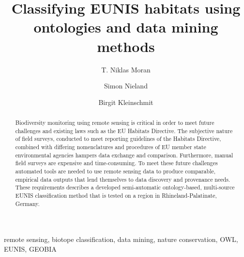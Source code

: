 \documentclass[authoryear,preprint,12pt,number]{elsarticle}
\begin{document}
\tableofcontents

\printglossary

%
\lstset{language=XML}

\begin{frontmatter}
\title{Classifying EUNIS habitats using ontologies and data mining methods}

\author[TUB]{T. Niklas Moran}

\author[TUB]{Simon Nieland}
\author[TUB]{Birgit Kleinschmit}

\address[TUB]{Geoinformation in Environmental Planning Lab, Technische
Universit\"at Berlin, Stra\ss e des 17. Juni 145, 10623 Berlin, Germany}


\begin{abstract}
Biodiversity monitoring using remote sensing is critical in order to 
meet future challenges and existing laws such as the EU Habitats Directive. The 
subjective nature of field surveys, conducted to meet reporting guidelines of  
the Habitats Directive, combined with differing nomenclatures and procedures 
of EU member state environmental agencies hampers data exchange and comparison. 
Furthermore, manual field surveys are expensive and time-consuming. To meet 
these future challenges automated tools are needed to use remote 
sensing data to produce comparable, empirical data outputs that lend 
themselves to data discovery and provenance needs. These requirements describes 
a developed semi-automatic ontology-based, multi-source EUNIS classification 
method that is tested on a region in Rhineland-Palatinate, Germany. 
\end{abstract}

\begin{keyword}
remote sensing, biotope classification, data mining, nature conservation, OWL, 
EUNIS, GEOBIA
\end{keyword}
\end{frontmatter}
\end{document}
